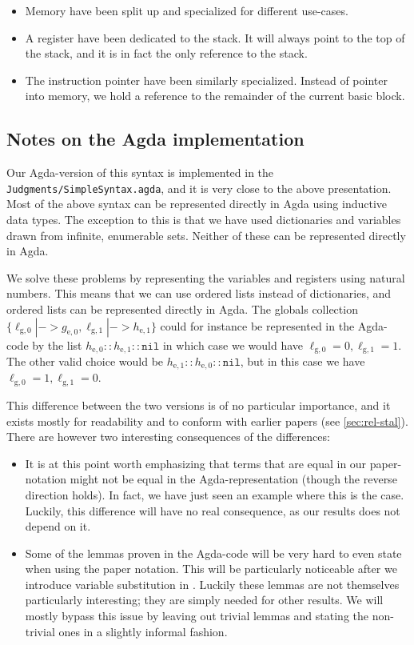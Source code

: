 \begin{itemize}
\item Memory have been split up and specialized for different use-cases.
\item A register have been dedicated to the stack. It will always point to the
  top of the stack, and it is in fact the only reference to the stack.
\item The instruction pointer have been similarly specialized. Instead of
  pointer into memory, we hold a reference to the remainder of the current basic
  block.
\end{itemize}

\subsection{Notes on the Agda implementation}

Our Agda-version of this syntax is implemented in the
\texttt{Judgments/SimpleSyntax.agda}, and it is very close to the above
presentation. Most of the above syntax can be represented directly in Agda using
inductive data types. The exception to this is that we have used dictionaries
and variables drawn from infinite, enumerable sets. Neither of these can be
represented directly in Agda.

We solve these problems by representing the variables and registers using
natural numbers. This means that we can use ordered lists instead of
dictionaries, and ordered lists can be represented directly in Agda. The globals
collection
$\{\ell_{\mathrm{g},0} |-> g_{\mathrm{e},0}, \ell_{\mathrm{g},1} |->
h_{\mathrm{e},1}\}$ could for instance be represented in the Agda-code by the
list $h_{\mathrm{e},0} :: h_{\mathrm{e},1} :: \mathtt{nil}$ in which case we
would have $\ell_{\mathrm{g},0} = 0, \ell_{\mathrm{g},1} = 1$. The other valid
choice would be $h_{\mathrm{e},1} :: h_{\mathrm{e},0} :: \mathtt{nil}$, but in
this case we have $\ell_{\mathrm{g},0} = 1, \ell_{\mathrm{g},1} = 0$.

This difference between the two versions is of no particular importance, and it
exists mostly for readability and to conform with earlier papers (see
\cref{sec:rel-stal}). There are however two interesting consequences of the
differences:

\begin{itemize}
\item It is at this point worth emphasizing that terms that are equal in our
  paper-notation might not be equal in the Agda-representation (though the
  reverse direction holds). In fact, we have just seen an example where this is
  the case. Luckily, this difference will have no real consequence, as our
  results does not depend on it.
\item Some of the lemmas proven in the Agda-code will be very hard to even state
  when using the paper notation. This will be particularly noticeable after we
  introduce variable substitution in \ATAL. Luckily these lemmas are not
  themselves particularly interesting; they are simply needed for other
  results. We will mostly bypass this issue by leaving out trivial lemmas and
  stating the non-trivial ones in a slightly informal fashion.
\end{itemize}

